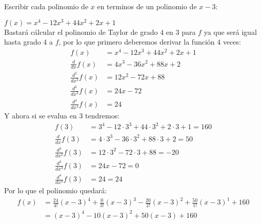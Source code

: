 \documentclass[../../main.tex]{subfiles}
\begin{document}
\question Escribir cada polinomio de $x$ en terminos de un polinomio de $x-3$:
\begin{partes}
    \parte $f(x) = x^4-12x^3+44x^2+2x+1$\\

    Bastará cálcular el polinomio de Taylor de grado $4$ en $3$ para $f$ ya que será igual hasta grado 4 a $f$, por lo que primero deberemos derivar la función 4 veces:
    \begin{align*}
        f(x) &= x^4-12x^3+44x^2+2x+1\\
        \frac{d}{dx} f(x) &= 4x^3 -36x^2+88x+2\\
        \frac{d^2}{dx^2} f(x) &= 12x^2 - 72x + 88\\
        \frac{d^3}{dx^3} f(x) &= 24x - 72\\
        \frac{d^4}{dx^4} f(x) &= 24
    \end{align*}
    Y ahora si se evalua en $3$ tendremos:
    \begin{align*}
        f(3) &= 3^4-12\cdot 3^3+44\cdot 3^2+2\cdot 3+1 = 160 \\
        \frac{d}{dx} f(3) &= 4\cdot 3^3 -36\cdot 3^2+88\cdot 3+2 = 50 \\
        \frac{d^2}{dx^2} f(3) &= 12\cdot 3^2 - 72\cdot 3 + 88 = -20\\
        \frac{d^3}{dx^3} f(3) &= 24x - 72 = 0\\
        \frac{d^4}{dx^4} f(3) &= 24 = 24
    \end{align*}
    Por lo que el polinomio quedará:
    \begin{align*}
        f(x) &= \frac{24}{4!}(x-3)^4 + \frac{0}{3!}(x-3)^3 -\frac{20}{2!}(x-3)^2 + \frac{50}{1!}(x-3)^1 + 160\\
        &= (x-3)^4 - 10(x-3)^2+50(x-3)+160
    \end{align*}
\end{partes}
\end{document}

